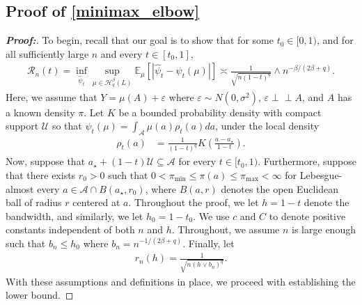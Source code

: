 \documentclass[11pt,twoside]{article}
\newcommand{\ind}{\perp\!\!\!\!\perp}
\def\ind{\perp\!\!\!\perp}
\theoremstyle{definition}
\theoremstyle{remark}
\begin{document}
\subsection{Proof of \cref{minimax_elbow}} \label{minimax_elbow_proof}

\begin{proof}[\textbf{Proof:}] To begin, recall that our goal is to show that for some $t_0 \in [0, 1)$, and for all sufficiently large $n$ and every $t\in[t_0,1]$,
\begin{align*} 
\mathcal{R}_n(t) =  \inf_{\widehat\psi_t} \sup_{\mu\in\mathcal{H}_q^\beta(L)} \mathbb{E}_\mu\left[\left| \widehat\psi_t -  \psi_t(\mu) \right| \right] \asymp \frac{1}{\sqrt{n(1-t)^q}} \wedge n^{-\beta/(2\beta+q)}.
\end{align*}
Here, we assume that $Y=\mu(A)+\varepsilon$ where $\varepsilon\sim N(0,\sigma^2)$, $\varepsilon\ind A$, and $A$ has a known density $\pi$. Let $K$ be a bounded probability density with compact support $\mathcal{U}$ so that $\psi_t(\mu) = \int_{\mathcal{A}}\mu(a)\rho_t(a)da$, under the local density
\begin{align*}
    \rho_t(a) &= \frac{1}{(1-t)^q} K\left(\frac{a-a_\star}{1-t}\right).
\end{align*}
Now, suppose that $a_\star+(1-t)\mathcal{U}\subseteq\mathcal{A}$ for every $t\in[t_0,1)$. Furthermore, suppose that there exists $r_0 > 0$ such that $0< \pi_{\min} \leq \pi(a) \leq \pi_{\max} <\infty$ for Lebesgue-almost every $a\in\mathcal{A}\cap B(a_\star,r_0)$, where $B(a, r)$ denotes the open Euclidean ball of radius $r$ centered at $a$. Throughout the proof, we let $h = 1 - t$ denote the bandwidth, and similarly, we let $h_0 = 1 - t_0$. We use $c$ and $C$ to denote positive constants independent of both $n$ and $h$. Throughout, we assume $n$ is large enough such that $b_n \leq h_0$ where $b_n=n^{-1/(2\beta+q)}$. Finally, let
\begin{align*}
     r_n(h)=\frac{1}{\sqrt{n(h\vee b_n)^{q}}}.
\end{align*}
With these assumptions and definitions in place, we proceed with establishing the lower bound. 
\medskip


\end{proof}
\end{document}
